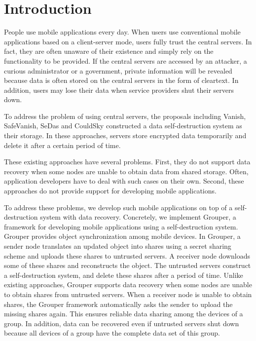 \documentclass[a4paper,11pt]{report}
\begin{document}
\tableofcontents
\listoffigures

\pagebreak \setcounter{page}{1}

\chapter{Introduction} \label{chapter:introduction}

People use mobile applications every day. 
When users use conventional mobile applications based on a client-server mode, users fully trust the central servers.
In fact, they are often unaware of their existence and simply rely on the functionality to be provided.
If the central servers are accessed by an attacker, a curious administrator or a government, private information will be revealed because data is often stored on the central servers in the form of cleartext.
In addition, users may lose their data when service providers shut their servers down.

To address the problem of using central servers, the proposals including Vanish\cite{geambasu2009vanish}, SafeVanish\cite{zeng2010safevanish}, SeDas\cite{zeng2012sedas} and CouldSky\cite{zeng2015cloudsky} constructed a data self-destruction system as their storage.
In these approaches, servers store encrypted data temporarily and delete it after a certain period of time.

These existing approaches have several problems.
First, they do not support data recovery when some nodes are unable to obtain data from shared storage.
Often, application developers have to deal with such cases on their own.
Second, these approaches do not provide support for developing mobile applications.

To address these problems, we develop such mobile applications on top of a self-destruction system with data recovery.
Concretely, we implement Grouper, a framework for developing mobile applications using a self-destruction system\cite{li2017grouper}. 
Grouper provides object synchronization among mobile devices.
In Grouper, a sender node translates an updated object into shares using a secret sharing scheme and uploads these shares to untrusted servers. 
A receiver node downloads some of these shares and reconstructs the object.
The untrusted servers construct a self-destruction system, and delete these shares after a period of time.
Unlike existing approaches, Grouper supports data recovery when some nodes are unable to obtain shares from untrusted servers.
When a receiver node is unable to obtain shares, the Grouper framework automatically asks the sender to upload the missing shares again.
This ensures reliable data sharing among the devices of a group.
In addition, data can be recovered even if untrusted servers shut down because all devices of a group have the complete data set of this group.
\end{document}
